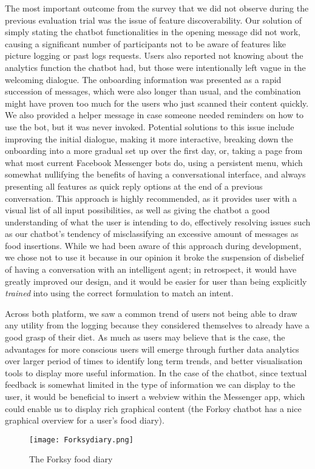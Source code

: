 The most important outcome from the survey that we did not observe during the previous evaluation trial was the issue of feature discoverability. Our solution of simply stating the chatbot functionalities in the opening message did not work, causing a significant number of participants not to be aware of features like picture logging or past logs requests. Users also reported not knowing about the analytics function the chatbot had, but those were intentionally left vague in the welcoming dialogue. The onboarding information was presented as a rapid succession of messages, which were also longer than usual, and the combination might have proven too much for the users who just scanned their content quickly. We also provided a helper message in case someone needed reminders on how to use the bot, but it was never invoked. Potential solutions to this issue include improving the initial dialogue, making it more interactive, breaking down the onboarding into a more gradual set up over the first day, or, taking a page from what most current Facebook Messenger bots do, using a persistent menu, which somewhat nullifying the benefits of having a conversational interface, and always presenting all features as quick reply options at the end of a previous conversation. This approach is highly recommended, as it provides user with a visual list of all input possibilities, as well as giving the chatbot a good understanding of what the user is intending to do, effectively resolving issues such as our chatbot's tendency of misclassifying an excessive amount of messages as food insertions. While we had been aware of this approach during development, we chose not to use it because in our opinion it broke the suspension of disbelief of having a conversation with an intelligent agent; in retrospect, it would have greatly improved our design, and it would be easier for user than being explicitly \textit{trained} into using the correct formulation to match an intent. 

Across both platform, we saw a common trend of users not being able to draw any utility from the logging because they considered themselves to already have a good grasp of their diet. As much as users may believe that is the case, the advantages for more conscious users will emerge through further data analytics over larger period of times to identify long term trends, and better visualisation tools to display more useful information. In the case of the chatbot, since textual feedback is somewhat limited in the type of information we can display to the user, it would be beneficial to insert a webview within the Messenger app, which could enable us to display rich graphical content (the Forksy chatbot has a nice graphical overview for a user's food diary). \\
\begin{figure}[h!]
  \centering
  \texttt{[image: Forksydiary.png]}
  \caption{The Forksy food diary}
\end{figure} 


